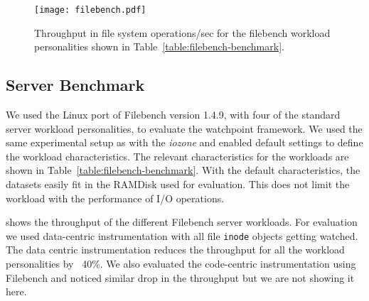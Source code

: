 \begin{figure}[!h]
\begin{center}
\texttt{[image: filebench.pdf]}
\end{center}
\caption[Performance impact of the watchpoint framework on Filebench server benchmark workloads.]{\label{fig:sever_performance}Throughput in file system operations/sec for the filebench workload personalities shown in Table~\ref{table:filebench-benchmark}.}
\end{figure}




\subsection{Server Benchmark}
We used the Linux port of Filebench version 1.4.9, with four of the standard server workload personalities, to evaluate the watchpoint framework. We used the same experimental setup as with the \emph{iozone} and enabled default settings to define the workload characteristics. The relevant characteristics for the workloads are shown in Table~\ref{table:filebench-benchmark}. With the default characteristics, the datasets easily fit in the RAMDisk used for evaluation. This does not limit the workload with the performance of I/O operations.

 shows the throughput of the different Filebench server workloads. For evaluation we used data-centric instrumentation with all file \texttt{inode} objects getting watched. The data centric instrumentation reduces the throughput for all the workload personalities by ~40\%. We also evaluated the code-centric instrumentation using Filebench and noticed similar drop in the throughput but we are not showing it here.




